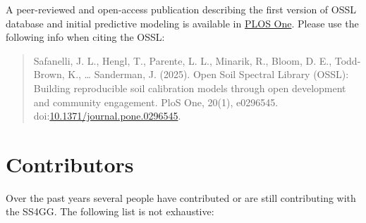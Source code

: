 \documentclass[
  letterpaper,
  DIV=11,
  numbers=noendperiod]{scrreprt}
\begin{document}
\begin{tcolorbox}[enhanced jigsaw, title=\textcolor{quarto-callout-tip-color}{\faLightbulb}\hspace{0.5em}{Publication alert!}, rightrule=.15mm, coltitle=black, opacityback=0, bottomrule=.15mm, colframe=quarto-callout-tip-color-frame, breakable, arc=.35mm, titlerule=0mm, toptitle=1mm, left=2mm, colback=white, toprule=.15mm, leftrule=.75mm, bottomtitle=1mm, opacitybacktitle=0.6, colbacktitle=quarto-callout-tip-color!10!white]

A peer-reviewed and open-access publication describing the first version
of OSSL database and initial predictive modeling is available in
\href{https://doi.org/10.1371/journal.pone.0296545}{PLOS One}. Please
use the following info when citing the OSSL:

\begin{quote}
Safanelli, J. L., Hengl, T., Parente, L. L., Minarik, R., Bloom, D. E.,
Todd-Brown, K., \ldots{} Sanderman, J. (2025). Open Soil Spectral
Library (OSSL): Building reproducible soil calibration models through
open development and community engagement. PloS One, 20(1), e0296545.
doi:\href{https://doi.org/10.1371/journal.pone.0296545}{10.1371/journal.pone.0296545}.
\end{quote}

\end{tcolorbox}

\section*{Contributors}\label{contributors}


Over the past years several people have contributed or are still
contributing with the SS4GG. The following list is not exhaustive:
\end{document}
